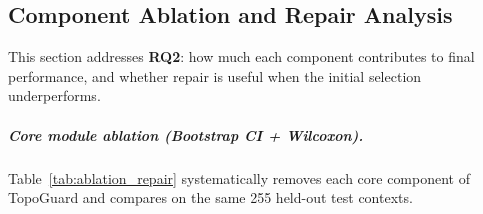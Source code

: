 \documentclass[manuscript,review,anonymous]{acmart}
\begin{document}
\begin{table}[t]
\centering
\caption{Auxiliary transfer results on Storm Surge ($N=144$--$168$ simulated contexts, 6 repeats per task). Results should be interpreted as supporting evidence because the contexts include noise-perturbed repeats derived from a smaller held-out set. TopoGuard improves over Static Workflow and Cheapest in quality. $\dagger$ Best-Quality achieves higher quality ($S=0.896$) than TopoGuard ($S=0.886$) at higher cost ($C=2.95$ vs $2.38$, $\times 10^{-2}$ USD), while TopoGuard achieves lower latency ($9.0$\,s vs $10.4$\,s); this reflects an operating-point trade-off between quality and cost/latency.}
\label{tab:storm_transfer}
\end{table}

\subsection{Component Ablation and Repair Analysis}
\label{subsec:ablation_repair}

This section addresses \textbf{RQ2}: how much each component contributes to final performance, and whether repair is useful when the initial selection underperforms.

\subparagraph{Core module ablation (Bootstrap CI + Wilcoxon).}
Table~\ref{tab:ablation_repair} systematically removes each core component of TopoGuard and compares on the same 255 held-out test contexts.
\end{document}
